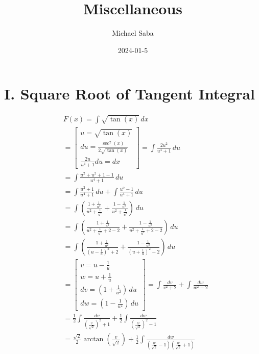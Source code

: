 \documentclass[12pt]{article}
\title{%
    \Huge Miscellaneous \\
}
\date{2024-01-5}
\author{Michael Saba}
\begin{document}
    \maketitle
    \newpage

    \section*{I. Square Root of Tangent Integral}
    \[
        \begin{aligned}
        & F(x) = \int \sqrt{\tan{(x)}} \, dx \\
        &= \begin{bmatrix}
            u = \sqrt{\tan{(x)}} \\
            du = \frac{\sec^2{(x)}}{2\sqrt{\tan{(x)}}} \\
            \frac{2u}{u^4 + 1}du = dx
        \end{bmatrix} = \int \frac{2u^2}{u^4 + 1} \, du \\
        &= \int \frac{u^2 + u^2 + 1 - 1}{u^4 + 1} \, du \\
        &= \int \frac{u^2 + 1}{u^4 + 1} \, du + \int \frac{u^2 - 1}{u^4 + 1} \, du \\
        &= \int \left(\frac{1 + \frac{1}{u^2}}{u^2 + \frac{1}{u^2}} + \frac{1 - \frac{1}{u^2}}{u^2 + \frac{1}{u^2}}\right) \, du \\
        &= \int \left(\frac{1 + \frac{1}{u^2}}{u^2 + \frac{1}{u^2} + 2 - 2} + \frac{1 - \frac{1}{u^2}}{u^2 + \frac{1}{u^2} + 2 - 2}\right) \, du \\
        &= \int \left(\frac{1 + \frac{1}{u^2}}{(u - \frac{1}{u})^2 + 2} + \frac{1 - \frac{1}{u^2}}{(u + \frac{1}{u})^2 - 2}\right) \, du \\
        &= \begin{bmatrix}
            v = u - \frac{1}{u} \\
            w = u + \frac{1}{u} \\
            dv = (1 + \frac{1}{u^2}) \, du \\
            dw = (1 - \frac{1}{u^2}) \, du
        \end{bmatrix}
        = \int \frac{dv}{v^2 + 2} + \int \frac{dw}{w^2 - 2} \\
        &= \frac{1}{2}\int \frac{dv}{\left(\frac{v}{\sqrt{2}}\right)^2 + 1} + \frac{1}{2}\int \frac{dw}{\left(\frac{w}{\sqrt{2}}\right)^2 - 1} \\
        &= \frac{\sqrt{2}}{2}\arctan{\left(\frac{v}{\sqrt{2}}\right)} + \frac{1}{2}\int \frac{dw}{\left(\frac{w}{\sqrt{2}} - 1\right)\left(\frac{w}{\sqrt{2}} + 1\right)} \\

\end{aligned}\]
\end{document}

